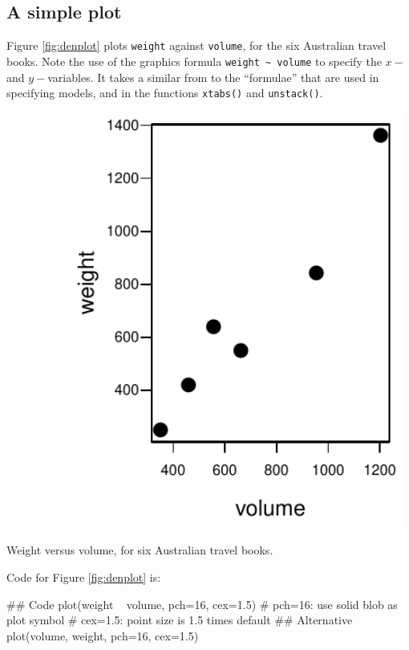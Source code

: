 \documentclass{tufte-book}\usepackage[]{graphicx}\usepackage[]{color}
\newcommand{\txtt}[1]{\texttt{#1}}
\begin{document}
\subsection*{A simple plot}
Figure \ref{fig:denplot} plots \txtt{weight} against \txtt{volume},
for the six Australian travel books.  Note the use of the graphics
formula \verb!weight ~ volume! to specify the $x-$ and
$y-$variables. It takes a similar from to the ``formulae'' that are
used in specifying models, and in the functions \txtt{xtabs()} and
\txtt{unstack()}.
\begin{marginfigure}
\begin{Schunk}


\centerline{\includegraphics[width=0.98\textwidth]{figs/01-denplot-1} }

\end{Schunk}
 \caption{Weight versus volume, for six Australian travel
books.}\label{fig:denplot}
\end{marginfigure}

Code for Figure \ref{fig:denplot} is:
\begin{Schunk}
\begin{Sinput}
## Code
plot(weight ~ volume, pch=16, cex=1.5)
  # pch=16: use solid blob as plot symbol
  # cex=1.5: point size is 1.5 times default
## Alternative
plot(volume, weight, pch=16, cex=1.5)
\end{Sinput}
\end{Schunk}
\end{document}
